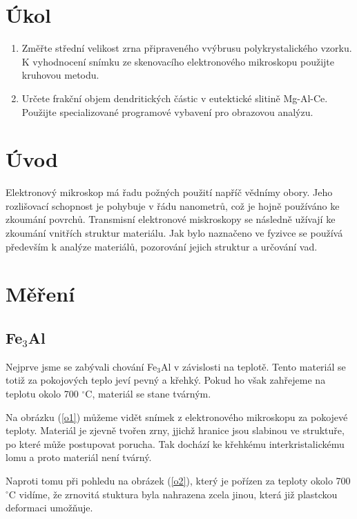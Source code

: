 \documentclass[a4paper,12pt]{article}
\begin{document}
\section{Úkol}
\begin{enumerate}
\item Změřte střední velikost zrna připraveného vvýbrusu polykrystalického vzorku. K vyhodnocení snímku ze skenovacího elektronového mikroskopu použijte kruhovou metodu.
\item Určete frakční objem dendritických částic v eutektické slitině Mg-Al-Ce. Použijte specializované programové vybavení pro obrazovou analýzu.
\end{enumerate}

\section{Úvod}
Elektronový mikroskop má řadu požných  použití napříč vědnímy obory. Jeho rozlišovací schopnost je pohybuje v řádu nanometrů, což je hojně používáno ke zkoumání povrchů. Transmisní elektronové miskroskopy se následně užívají ke zkoumání vnitřích struktur materiálu. Jak bylo naznačeno ve fyzivce se používá především k analýze materiálů, pozorování jejich struktur a určování vad.

\section{Měření}
\subsection{Fe$_3$Al}
Nejprve jsme se zabývali chování Fe$_3$Al v závislosti na teplotě. Tento materiál se totiž za pokojových teplo jeví pevný a křehký. Pokud 
ho však zahřejeme na teplotu okolo 700 $^\circ$C, materiál se stane tvárným. 

Na obrázku (\ref{o1}) můžeme vidět snímek z elektronového mikroskopu za pokojevé teploty. Materiál je zjevně tvořen zrny, jjichž hranice 
jsou slabinou ve struktuře, po které může postupovat porucha. Tak dochází ke křehkému interkristalickému lomu a proto materiál není tvárný. 

Naproti tomu při pohledu na obrázek (\ref{o2}), který je pořízen za teploty okolo 700 $^\circ$C vidíme, že zrnovitá stuktura byla nahrazena 
zcela jinou, která již plastckou deformaci umožňuje.
\end{document}
